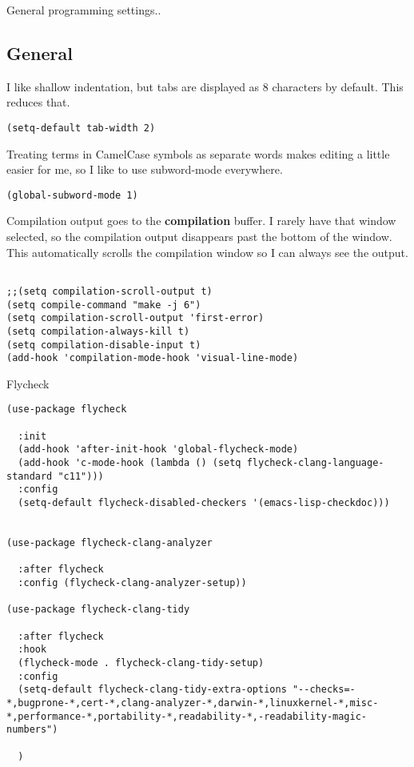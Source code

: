 \documentclass[12pt]{article}
\begin{document}
General programming settings..

\subsection{General}
\label{sec:orgc4f5a25}

I like shallow indentation, but tabs are displayed as 8 characters by default. This reduces that.

\begin{verbatim}
(setq-default tab-width 2)
\end{verbatim}

Treating terms in CamelCase symbols as separate words makes editing a little
easier for me, so I like to use subword-mode everywhere.
\begin{verbatim}
(global-subword-mode 1)
\end{verbatim}

Compilation output goes to the \textbf{compilation} buffer. I rarely have that window
selected, so the compilation output disappears past the bottom of the window.
This automatically scrolls the compilation window so I can always see the
output.

\begin{verbatim}

;;(setq compilation-scroll-output t)
(setq compile-command "make -j 6")
(setq compilation-scroll-output 'first-error)
(setq compilation-always-kill t)
(setq compilation-disable-input t)
(add-hook 'compilation-mode-hook 'visual-line-mode)

\end{verbatim}

Flycheck 
\begin{verbatim}
(use-package flycheck

  :init
  (add-hook 'after-init-hook 'global-flycheck-mode)
  (add-hook 'c-mode-hook (lambda () (setq flycheck-clang-language-standard "c11")))
  :config
  (setq-default flycheck-disabled-checkers '(emacs-lisp-checkdoc)))


(use-package flycheck-clang-analyzer

  :after flycheck
  :config (flycheck-clang-analyzer-setup))

(use-package flycheck-clang-tidy

  :after flycheck
  :hook
  (flycheck-mode . flycheck-clang-tidy-setup)
  :config
  (setq-default flycheck-clang-tidy-extra-options "--checks=-*,bugprone-*,cert-*,clang-analyzer-*,darwin-*,linuxkernel-*,misc-*,performance-*,portability-*,readability-*,-readability-magic-numbers")

  )
\end{verbatim}
\end{document}
